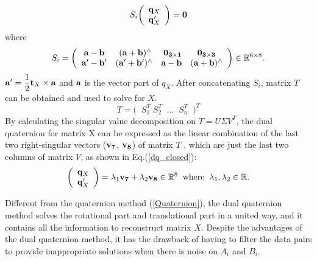 \documentclass[twocolumn,10pt]{asme2ej}
\newcommand{\ttt}{{\bf t}}
\newcommand{\aaa}{{\bf a}}
\newcommand{\bbb}{{\bf b}}
\begin{document}
\begin{equation}
S_{i}
\bigg(
\begin{array}{c}
{\bf q}_{X}\\
{\bf q}^{\prime}_{X}

\end{array}
\bigg) = \bf 0
\end{equation} 
where
\begin{equation}
S_{i} = 
\bigg(
\begin{array}{cccc}

{\aaa} - {\bbb} & \; ({\aaa} + {\bbb})^{\wedge} & \; \bf 0_{3\times 1} & \bf 0_{3\times 3}\\

{\aaa}^{\prime} - {\bbb}^{\prime} & ({{\aaa}^{\prime} + {\bbb}^{\prime}})^{\wedge} & {\aaa} - {\bbb} & ({\aaa} + {\bbb})^{\wedge} 

\end{array}
\bigg) \in \mathbb{R}^{6 \times 8}.
\end{equation}
${\aaa}^{\prime} = \dfrac{1}{2}{\ttt}_{X} \times {\aaa}$ and $\aaa$ is the vector part of $q_{X}$.
After concatenating $S_{i}$, matrix $T$ can be obtained and used to solve for $X$.
\begin{equation}
T = \big( \; \; S_{1}^{T} \; S_{2}^{T} \; \; ... \; \; S_{n}^{T} \; \; \big)^{T}
\end{equation}
By calculating the singular value decomposition on $T = U\Sigma V^{T}$, the dual quaternion for matrix X can be expressed as the linear combination of the last two right-singular vectors (${\bf v_{7}}$, ${\bf v_{8}}$) of matrix $T$ , which are just the last two columns of matrix $V$, as shown in Eq.(\ref{dq_closed}): 
\begin{equation}
\bigg(
\begin{array}{c}
{\bf q}_{X}\\
{\bf q}^{\prime}_{X}
\end{array}
\bigg) = 
\lambda_{1}{\bf v_{7}} + \lambda_{2}{\bf v_{8}} \in \mathbb{R}^{8} \; \;
\text{where} \; \; \lambda_{1}, \lambda_{2} \in \mathbb{R}.
\label{dq_closed}
\end{equation} 

Different from the quaternion method (\ref{Quaternion}), the dual quaternion method solves the rotational part and translational part in a united way, and it contains all the information to reconstruct matrix $X$. Despite the advantages of the dual quaternion method, it has the drawback of having to filter the data pairs to provide inappropriate solutions when there is noise on $A_{i}$ and $B_{i}$.
\end{document}
